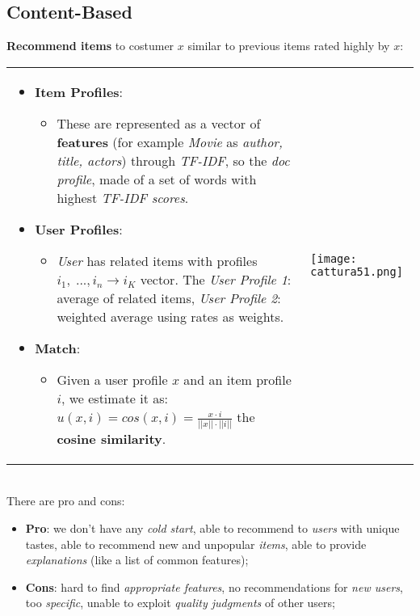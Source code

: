 \documentclass{article}
\begin{document}
\subsection{Content-Based}
\textbf{Recommend items} to costumer $x$ similar to previous items rated highly by $x$:\\
\begin{tabular}{C{7cm}  L{8cm}}

\begin{itemize}
\item \textbf{Item Profiles}:
\begin{itemize}
\item These are represented as a vector of \textbf{features} (for example \emph{Movie} as \emph{author, title, actors}) through \emph{TF-IDF}, so the \emph{doc profile}, made of a set of words with highest \emph{TF-IDF scores}.
\end{itemize}
\item \textbf{User Profiles}:
\begin{itemize}
\item \emph{User} has related items with profiles $i_1,\;...,i_n \rightarrow i_K$ vector. The \emph{User Profile 1}: average of related items, \emph{User Profile 2}: weighted average using rates as weights.
\end{itemize}

\item \textbf{Match}:
\begin{itemize}
\item Given a user profile $x$ and an item profile $i$, we estimate it as: $u(x,i) = cos(x,i) = \frac{x \cdot i}{||x|| \cdot ||i||}$ the \textbf{cosine similarity}.
\end{itemize}
\end{itemize}

& \texttt{[image: cattura51.png]}
\end{tabular}\\
There are pro and cons:
\begin{itemize}
\item \textbf{Pro}: we don't have any \emph{cold start}, able to recommend to \emph{users} with unique tastes, able to recommend new and unpopular \emph{items}, able to provide \emph{explanations} (like a list of common features);
\item \textbf{Cons}: hard to find \emph{appropriate features}, no recommendations for \emph{new users}, too \emph{specific}, unable to exploit \emph{quality judgments} of other users;
\end{itemize}
\end{document}
